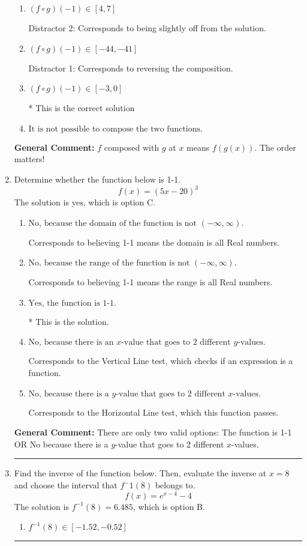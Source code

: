 \documentclass{extbook}[14pt]
\newcommand{\litem}[1]{\item #1

\rule{\textwidth}{0.4pt}}
\begin{document}
\begin{enumerate}
{\begin{enumerate}[label=\Alph*.]
 Distractor 3: Corresponds to being slightly off from the solution.
\item \( (f \circ g)(-1) \in [4, 7] \)

 Distractor 2: Corresponds to being slightly off from the solution.
\item \( (f \circ g)(-1) \in [-44, -41] \)

 Distractor 1: Corresponds to reversing the composition.
\item \( (f \circ g)(-1) \in [-3, 0] \)

* This is the correct solution
\item \( \text{It is not possible to compose the two functions.} \)


\end{enumerate}

\textbf{General Comment:} $f$ composed with $g$ at $x$ means $f(g(x))$. The order matters!
}
\litem{
Determine whether the function below is 1-1.
\[ f(x) = (5 x - 20)^3 \]The solution is \( \text{yes} \), which is option C.\begin{enumerate}[label=\Alph*.]
\item \( \text{No, because the domain of the function is not $(-\infty, \infty)$.} \)

Corresponds to believing 1-1 means the domain is all Real numbers.
\item \( \text{No, because the range of the function is not $(-\infty, \infty)$.} \)

Corresponds to believing 1-1 means the range is all Real numbers.
\item \( \text{Yes, the function is 1-1.} \)

* This is the solution.
\item \( \text{No, because there is an $x$-value that goes to 2 different $y$-values.} \)

Corresponds to the Vertical Line test, which checks if an expression is a function.
\item \( \text{No, because there is a $y$-value that goes to 2 different $x$-values.} \)

Corresponds to the Horizontal Line test, which this function passes.
\end{enumerate}

\textbf{General Comment:} There are only two valid options: The function is 1-1 OR No because there is a $y$-value that goes to 2 different $x$-values.
}
\litem{
Find the inverse of the function below. Then, evaluate the inverse at $x = 8$ and choose the interval that $f^-1(8)$ belongs to.
\[ f(x) = e^{x-4}-4 \]The solution is \( f^{-1}(8) = 6.485 \), which is option B.\begin{enumerate}[label=\Alph*.]
\item \( f^{-1}(8) \in [-1.52, -0.52] \)


\end{enumerate}}
\end{enumerate}
\end{document}
